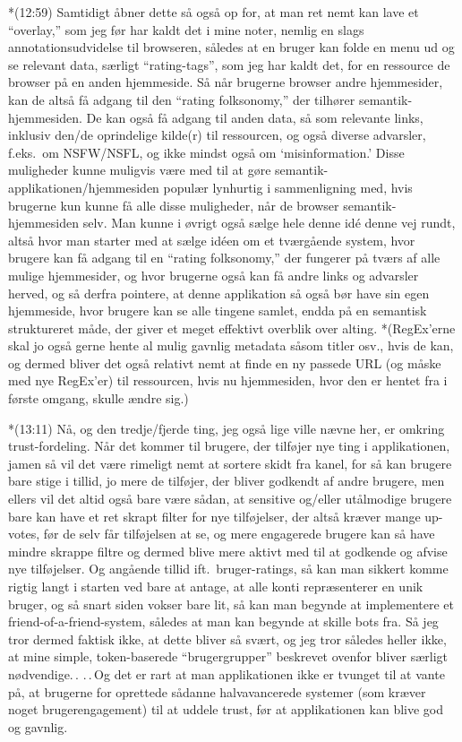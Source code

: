 \documentclass{report}
\begin{document}
*(12:59) Samtidigt åbner dette så også op for, at man ret nemt kan lave et ``overlay,'' som jeg før har kaldt det i mine noter, nemlig en slags annotationsudvidelse til browseren, således at en bruger kan folde en menu ud og se relevant data, særligt ``rating-tags'', som jeg har kaldt det, for en ressource de browser på en anden hjemmeside. Så når brugerne browser andre hjemmesider, kan de altså få adgang til den ``rating folksonomy,'' der tilhører semantik-hjemmesiden. De kan også få adgang til anden data, så som relevante links, inklusiv den/de oprindelige kilde(r) til ressourcen, og også diverse advarsler, f.eks.\ om NSFW/NSFL, og ikke mindst også om `misinformation.' Disse muligheder kunne muligvis være med til at gøre semantik-applikationen/hjemmesiden populær lynhurtig i sammenligning med, hvis brugerne kun kunne få alle disse muligheder, når de browser semantik-hjemmesiden selv. Man kunne i øvrigt også sælge hele denne idé denne vej rundt, altså hvor man starter med at sælge idéen om et tværgående system, hvor brugere kan få adgang til en ``rating folksonomy,'' der fungerer på tværs af alle mulige hjemmesider, og hvor brugerne også kan få andre links og advarsler herved, og så derfra pointere, at denne applikation så også bør have sin egen hjemmeside, hvor brugere kan se alle tingene samlet, endda på en semantisk struktureret måde, der giver et meget effektivt overblik over alting. 
*(RegEx'erne skal jo også gerne hente al mulig gavnlig metadata såsom titler osv., hvis de kan, og dermed bliver det også relativt nemt at finde en ny passede URL (og måske med nye RegEx'er) til ressourcen, hvis nu hjemmesiden, hvor den er hentet fra i første omgang, skulle ændre sig.)

*(13:11) Nå, og den tredje/fjerde ting, jeg også lige ville nævne her, er omkring trust-fordeling. Når det kommer til brugere, der tilføjer nye ting i applikationen, jamen så vil det være rimeligt nemt at sortere skidt fra kanel, for så kan brugere bare stige i tillid, jo mere de tilføjer, der bliver godkendt af andre brugere, men ellers vil det altid også bare være sådan, at sensitive og/eller utålmodige brugere bare kan have et ret skrapt filter for nye tilføjelser, der altså kræver mange up-votes, før de selv får tilføjelsen at se, og mere engagerede brugere kan så have mindre skrappe filtre og dermed blive mere aktivt med til at godkende og afvise nye tilføjelser. Og angående tillid ift.\ bruger-ratings, så kan man sikkert komme rigtig langt i starten ved bare at antage, at alle konti repræsenterer en unik bruger, og så snart siden vokser bare lit, så kan man begynde at implementere et friend-of-a-friend-system, således at man kan begynde at skille bots fra. Så jeg tror dermed faktisk ikke, at dette bliver så svært, og jeg tror således heller ikke, at mine simple, token-baserede ``brugergrupper'' beskrevet ovenfor bliver særligt nødvendige.\,. .\,.\,Og det er rart at man applikationen ikke er tvunget til at vante på, at brugerne for oprettede sådanne halvavancerede systemer (som kræver noget brugerengagement) til at uddele trust, før at applikationen kan blive god og gavnlig. 
\end{document}
